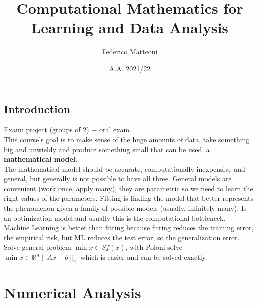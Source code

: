 \documentclass[10pt]{report}
\begin{document}
\title{Computational Mathematics for Learning and Data Analysis}
\author{Federico Matteoni}
\date{A.A. 2021/22}
\renewcommand*\contentsname{Index}

\maketitle
\tableofcontents
\pagebreak
\section{Introduction}
Exam: project (groups of 2) + oral exam.\\
This course's goal is to make sense of the huge amounts of data, take something big and unwieldy and produce something small that can be used, a \textbf{mathematical model}.\\
The mathematical model should be accurate, computationally inexpensive and general, but generally is not possible to have all three. General models are convenient (work once, apply many), they are parametric so we need to learn the right values of the parameters. Fitting is finding the model that better represents the phenomenon given a family of possible models (usually, infinitely many). Is an optimization model and usually this is the computational bottleneck.\\
Machine Learning is better than fitting because fitting reduces the training error, the empirical risk, but ML reduces the test error, so the generalization error.\\
Solve general problem $\min{x\in S}f(x)$, with Poloni solve $\min{x\in \mathbb{R}^n}\|Ax - b\|_2$ which is easier and can be solved exactly.
\chapter{Numerical Analysis}
\end{document}

